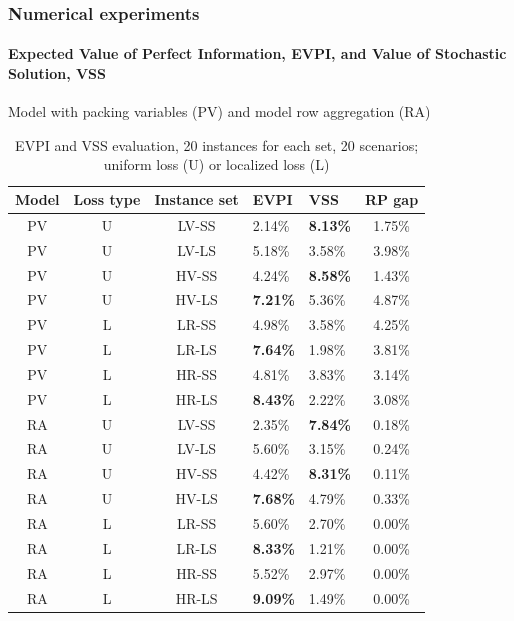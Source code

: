 \documentclass[9pt,xcolor={dvipsnames}]{beamer}
\begin{document}
\begin{frame}[allowframebreaks]
	\frametitle{Numerical experiments}
	\framesubtitle{Expected Value of Perfect Information, EVPI, and Value of Stochastic Solution, VSS}
	Model with packing variables (PV) and model row aggregation (RA)
	\begin{table}[h!]
		\centering
		\footnotesize
		\begin{tabular}{c c c j f c}
			\hline
			Model & 
			Loss type & 
			Instance set & 
			EVPI & 
			VSS & 
			RP gap \\
			\hline
			PV & U & LV-SS & 2.14\% & \textbf{8.13\%} & 1.75\%  \\
			PV & U & LV-LS & 5.18\% & 3.58\% & 3.98\% \\
			PV & U & HV-SS & 4.24\% & \textbf{8.58\%} & 1.43\% \\
			PV & U & HV-LS & \textbf{7.21\%} & 5.36\% & 4.87\% \\
			\hline
			PV & L & LR-SS & 4.98\% & 3.58\% & 4.25\% \\
			PV & L & LR-LS & \textbf{7.64\%} & 1.98\% & 3.81\% \\
			PV & L & HR-SS & 4.81\% & 3.83\% & 3.14\% \\
			PV & L & HR-LS & \textbf{8.43\%} & 2.22\% & 3.08\% \\
			\hline
			RA & U & LV-SS & 2.35\% & \textbf{7.84\%} & 0.18\% \\
			RA & U & LV-LS & 5.60\% & 3.15\% & 0.24\% \\
			RA & U & HV-SS & 4.42\% & \textbf{8.31\%} & 0.11\% \\
			RA & U & HV-LS & \textbf{7.68\%} & 4.79\% & 0.33\% \\
			\hline
			RA & L & LR-SS & 5.60\% & 2.70\% & 0.00\%  \\
			RA & L & LR-LS & \textbf{8.33\%} & 1.21\% & 0.00\%  \\
			RA & L & HR-SS & 5.52\% & 2.97\% & 0.00\% \\
			RA & L & HR-LS & \textbf{9.09\%} & 1.49\% & 0.00\% \\
			\hline
		\end{tabular}
		\caption{EVPI and VSS evaluation, 20 instances for each set, 20 scenarios; uniform loss (U) or localized loss (L)}
		\label{tab:optres}
	\end{table}
\end{frame}
\end{document}
